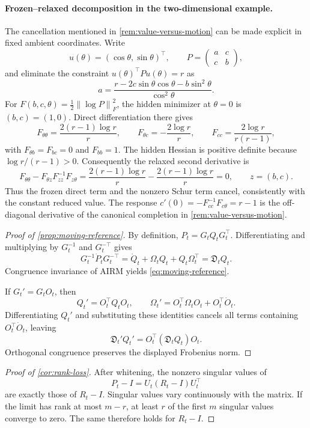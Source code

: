 \documentclass[10pt]{article}
\theoremstyle{plain}
\theoremstyle{definition}
\theoremstyle{remark}
\newcommand{\fro}[1]{\left\lVert #1\right\rVert_F}
\begin{document}
\paragraph{Frozen--relaxed decomposition in the two-dimensional example.}
The cancellation mentioned in \cref{rem:value-versus-motion} can be made
explicit in fixed ambient coordinates.  Write
\[
  u(\theta)=(\cos\theta,\sin\theta)^\top,
  \qquad
  P=\begin{pmatrix}a&c\\c&b\end{pmatrix},
\]
and eliminate the constraint \(u(\theta)^\top Pu(\theta)=r\) as
\[
  a=
  \frac{r-2c\sin\theta\cos\theta-b\sin^2\theta}
       {\cos^2\theta}.
\]
For
\(F(b,c,\theta)=\tfrac12\fro{\log P}^2\), the hidden minimizer at
\(\theta=0\) is \((b,c)=(1,0)\).  Direct differentiation there gives
\[
  F_{\theta\theta}=\frac{2(r-1)\log r}{r},
  \qquad
  F_{\theta c}=-\frac{2\log r}{r},
  \qquad
  F_{cc}=\frac{2\log r}{r(r-1)},
\]
with \(F_{\theta b}=F_{bc}=0\) and \(F_{bb}=1\).  The hidden Hessian is
positive definite because \(\log r/(r-1)>0\).  Consequently the relaxed
second derivative is
\[
  F_{\theta\theta}
  -F_{\theta z}F_{zz}^{-1}F_{z\theta}
  =\frac{2(r-1)\log r}{r}
  -\frac{2(r-1)\log r}{r}
  =0,
  \qquad z=(b,c).
\]
Thus the frozen direct term and the nonzero Schur term cancel, consistently
with the constant reduced value.  The response
\(c'(0)=-F_{cc}^{-1}F_{c\theta}=r-1\) is the off-diagonal derivative of the
canonical completion in \cref{rem:value-versus-motion}.

\begin{proof}[Proof of \cref{prop:moving-reference}]
By definition, \(P_t=G_tQ_tG_t^\top\).  Differentiating and multiplying by
\(G_t^{-1}\) and \(G_t^{-\top}\) gives
\[
  G_t^{-1}\dot P_tG_t^{-\top}
  =\dot Q_t+\Omega_tQ_t+Q_t\Omega_t^\top
  =\mathfrak D_tQ_t.
\]
Congruence invariance of AIRM yields \eqref{eq:moving-reference}.

If \(G_t'=G_tO_t\), then
\[
  Q_t'=O_t^\top Q_tO_t,
  \qquad
  \Omega_t'=O_t^\top\Omega_tO_t+O_t^\top\dot O_t.
\]
Differentiating \(Q_t'\) and substituting these identities cancels all terms
containing \(O_t^\top\dot O_t\), leaving
\[
  \mathfrak D_t'Q_t'=O_t^\top(\mathfrak D_tQ_t)O_t.
\]
Orthogonal congruence preserves the displayed Frobenius norm.
\end{proof}

\begin{proof}[Proof of \cref{cor:rank-loss}]
After whitening, the nonzero singular values of
\[
  P_t-I=U_t(R_t-I)U_t^\top
\]
are exactly those of \(R_t-I\).  Singular values vary continuously with the
matrix.  If the limit has rank at most \(m-r\), at least \(r\) of the first
\(m\) singular values converge to zero.  The same therefore holds for
\(R_t-I\).
\end{proof}
\end{document}
